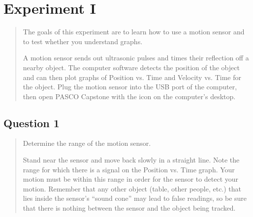 \documentclass[8pt]{extarticle}
\title{}
\author{Avinash Iyer}
\date{}
\begin{document}
{
\section*{Experiment I}
\begin{quote}
	The goals of this experiment are to learn how to use a motion sensor and to test whether you understand graphs.
	
	A motion sensor sends out ultrasonic pulses and times their reflection off a nearby object.  The computer software detects the position of the object and can then plot graphs of Position vs. Time and Velocity vs. Time for the object.  Plug the motion sensor into the USB port of the computer, then open PASCO Capstone with the icon on the computer’s desktop. 
\end{quote}
\subsection*{Question 1}
\begin{quote}
	Determine the range of the motion sensor.
	
	Stand near the sensor and move back slowly in a straight line.  Note the range for which there is a signal on the Position vs. Time graph. Your motion must be within this range in order for the sensor to detect your motion.  Remember that any other object (table, other people, etc.) that lies inside the sensor’s “sound cone” may lead to false readings, so be sure that there is nothing between the sensor and the object being tracked. 
	

\end{quote}}
\end{document}
